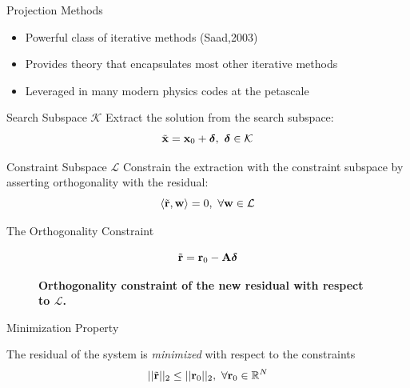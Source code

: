\documentclass{beamer}
\begin{document}
\begin{frame}{Projection Methods}

  \begin{itemize}
  \item Powerful class of iterative methods (Saad,2003)
  \item Provides theory that encapsulates most other iterative methods
  \item Leveraged in many modern physics codes at the petascale
  \end{itemize}

  \medskip \medskip
  \begin{beamerboxesrounded}[upper=boxheadcolor,lower=boxbodycolor,shadow=true]
    {Search Subspace $\mathcal{K}$} Extract the solution from the
    search subspace:
    \[
    \tilde{\mathbf{x}} = \mathbf{x}_0 +
    \boldsymbol{\delta},\ \boldsymbol{\delta} \in \mathcal{K}
    \]
  \end{beamerboxesrounded}

  \medskip \medskip
  \begin{beamerboxesrounded}[upper=boxheadcolor,lower=boxbodycolor,shadow=true]
    {Constraint Subspace $\mathcal{L}$} Constrain the extraction with
    the constraint subspace by asserting orthogonality with the
    residual:
    \[
    \langle \tilde{\mathbf{r}},\mathbf{w} \rangle = 0,\ \forall \mathbf{w} \in
    \mathcal{L}
    \]  
  \end{beamerboxesrounded}

\end{frame}

\begin{frame}{The Orthogonality Constraint}

  \[
  \tilde{\mathbf{r}} = \mathbf{r}_0 - \mathbf{A}\boldsymbol{\delta}
  \]

  \begin{figure}[htpb!]
    \begin{center}
      \scalebox{1.1}{  }
    \end{center}
    \caption{\textbf{Orthogonality constraint of the new residual with
        respect to $\mathcal{L}$.}}
  \end{figure}

  \begin{beamerboxesrounded}[upper=boxheadcolor,lower=boxbodycolor,shadow=true]
    {Minimization Property}

    The residual of the system is \textit{minimized} with respect to
    the constraints
    \[
    ||\tilde{\mathbf{r}}||_2 \leq ||\mathbf{r}_0||_2,\ \forall \mathbf{r}_0 \in
    \mathbb{R}^N
    \]
  \end{beamerboxesrounded}

\end{frame}
\end{document}
